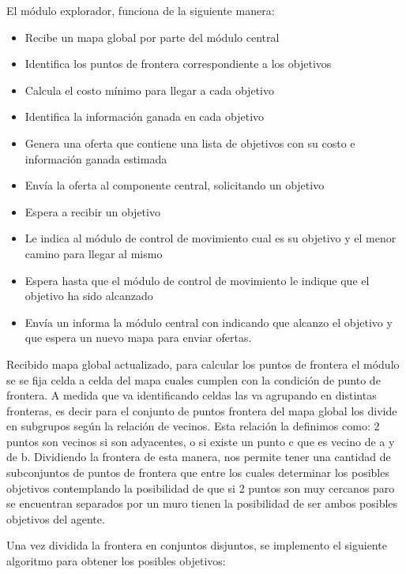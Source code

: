 \documentclass[runningheads]{llncs}
\begin{document}
El módulo explorador, funciona de la siguiente manera:
\begin{itemize}
	
	\item Recibe un mapa global por parte del módulo central
	\item Identifica los puntos de frontera correspondiente a los objetivos
	\item Calcula el costo mínimo para llegar a cada objetivo
	\item Identifica la información ganada en cada objetivo
	\item Genera una oferta que contiene una lista de objetivos con su costo e información ganada estimada
	\item Envía la oferta al componente central, solicitando un objetivo
	\item Espera a recibir un objetivo
	\item Le indica al módulo de control de movimiento cual es su objetivo y el menor camino para llegar al mismo
	\item Espera hasta que el módulo de control de movimiento le indique que el objetivo ha sido alcanzado
	\item Envía un informa la módulo central con indicando que alcanzo el objetivo y que espera un nuevo mapa para enviar ofertas.
	
\end{itemize}

Recibido mapa global actualizado, para calcular los puntos de frontera el módulo se se fija celda a celda del mapa cuales cumplen con la condición de punto de frontera. A medida que va identificando celdas las va agrupando en distintas fronteras, es decir para el conjunto de puntos frontera del mapa global los divide en subgrupos según la relación de vecinos. Esta relación la definimos como: 2 puntos son vecinos si son adyacentes, o si existe un punto c que es vecino de a y de b. Dividiendo la frontera de esta manera, nos permite tener una cantidad de subconjuntos de puntos de frontera que entre los cuales determinar los posibles objetivos contemplando la posibilidad de que si 2 puntos son muy cercanos paro se encuentran separados por un muro tienen la posibilidad de ser ambos posibles objetivos del agente.

Una vez dividida la frontera en conjuntos disjuntos, se implemento el siguiente algoritmo para obtener los posibles objetivos: 
\end{document}
